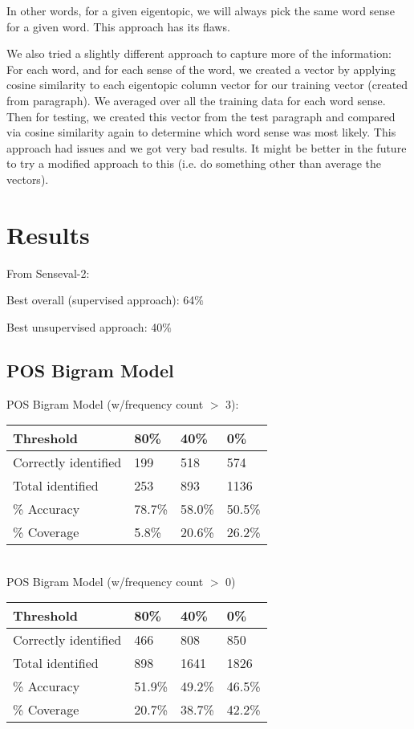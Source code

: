 \documentclass[10pt, letterpaper]{article}
\begin{document}
	In other words, for a given eigentopic, we will always pick the same word sense for a given word. This approach has its flaws.

	We also tried a slightly different approach to capture more of the information: For each word, and for each sense of the word, we created a vector by applying cosine similarity to each eigentopic column vector for our training vector (created from paragraph). We averaged over all the training data for each word sense. Then for testing, we created this vector from the test paragraph and compared via cosine similarity again to determine which word sense was most likely. 
	This approach had issues and we got very bad results. 
	It might be better in the future to try a modified approach to this (i.e. do something other than average the vectors).

	\section{Results}
	From Senseval-2:

	Best overall (supervised approach): 64$\%$	

	Best unsupervised approach: 40$\%$

	\subsection{POS Bigram Model}

	POS Bigram Model (w/frequency count $>$ 3): 
	\begin{table}[h]
	\begin{tabular}{|l|l|l|l|}
	\hline
	Threshold            & 80\%   & 40\%   & 0\%    \\ \hline
	Correctly identified & 199    & 518    & 574    \\ \hline
	Total identified     & 253    & 893    & 1136   \\ \hline
	\% Accuracy          & 78.7\% & 58.0\% & 50.5\% \\ \hline
	\% Coverage			 & 5.8\%  & 20.6\% & 26.2\% \\ \hline
	\end{tabular}
	\end{table}\\
	POS Bigram Model (w/frequency count $>$ 0)
	\begin{table}[h]
	\begin{tabular}{|l|l|l|l|}
	\hline
	Threshold            & 80\%   & 40\%   & 0\%    \\ \hline
	Correctly identified & 466    & 808    & 850    \\ \hline
	Total identified     & 898    & 1641   & 1826   \\ \hline
	\% Accuracy          & 51.9\% & 49.2\% & 46.5\% \\ \hline
	\% Coverage          & 20.7\% & 38.7\% & 42.2\% \\ \hline
	\end{tabular}
	\end{table}
\end{document}
